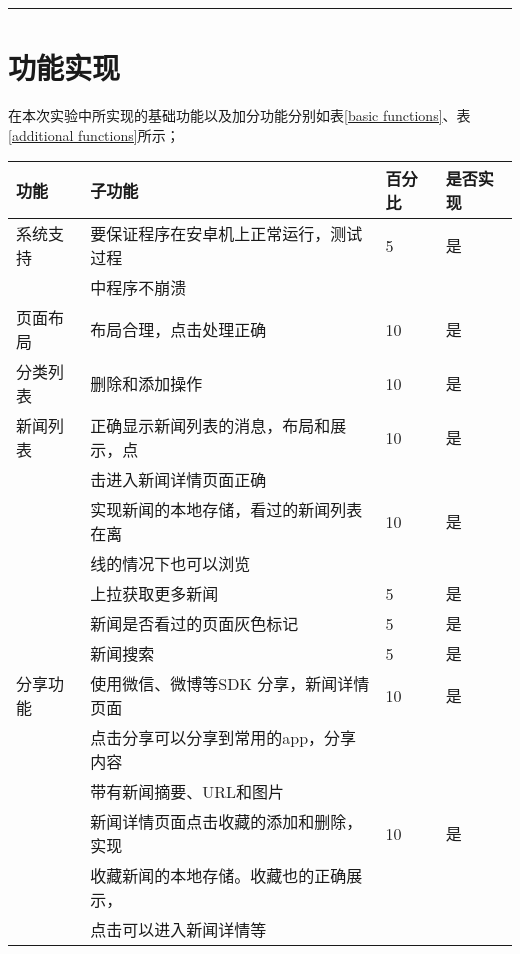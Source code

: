 \documentclass[UTF8]{ctexart}
\title{\zihao{1}{2017年夏季Java小学期大作业\\ 实验报告}}
\author{陈经基\\2015011358 \and 高信龙一\\2015080060 \and 张蔚\\2015011352}
\date{\today} %
\begin{document}

\maketitle
\hrule



\tableofcontents


\newpage
\section{功能实现}
在本次实验中所实现的基础功能以及加分功能分别如表\ref{basic functions}、表\ref{additional functions}所示； 
\begin{table*}[!htb]
\centering
\caption{基础功能实现说明表格}
\label{basic functions}
\begin{tabular}{llll}
\toprule
功能 &子功能 &百分比 &是否实现\\
\midrule
系统支持 &要保证程序在安卓机上正常运行，测试过程 &5 &是\\
&中程序不崩溃 &&\\
页面布局 &布局合理，点击处理正确 &10 &是\\
分类列表 &删除和添加操作 &10 &是\\
新闻列表 &正确显示新闻列表的消息，布局和展示，点 &10 &是\\
&击进入新闻详情页面正确 &&\\
&实现新闻的本地存储，看过的新闻列表在离 &10 &是\\
&线的情况下也可以浏览 &&\\
&上拉获取更多新闻 &5 &是\\
&新闻是否看过的页面灰色标记 &5 &是\\
&新闻搜索 &5 &是\\
分享功能&使用微信、微博等SDK 分享，新闻详情页面 &10 &是\\
&点击分享可以分享到常用的app，分享内容 &&\\
&带有新闻摘要、URL和图片 &&\\
&新闻详情页面点击收藏的添加和删除，实现 &10 &是\\
&收藏新闻的本地存储。收藏也的正确展示， &&\\
&点击可以进入新闻详情等 &&\\
\bottomrule
\end{tabular}
\end{table*}
\end{document}
